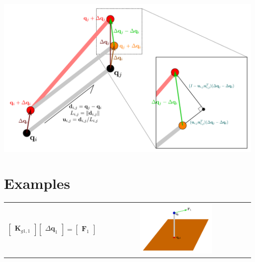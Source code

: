 \documentclass{article}
\begin{document}
\begin{center}
\includegraphics[width = \textwidth]{elastic_beam}
\end{center}




\section{Examples}

\begin{tabular}{cc}  
\parbox{0.5\textwidth}{
\[\begin{bmatrix} 
\mathbf{K}_{g1,1}
\end{bmatrix}\begin{bmatrix} 
\Delta\mathbf{q}_1
\end{bmatrix} = \begin{bmatrix}
\mathbf{F}_1
\end{bmatrix}\]
} & \parbox{0.5\textwidth}{
\includegraphics[width = 0.5\textwidth]{elastic_mesh_example_1}
}
\end{tabular}
\end{document}
